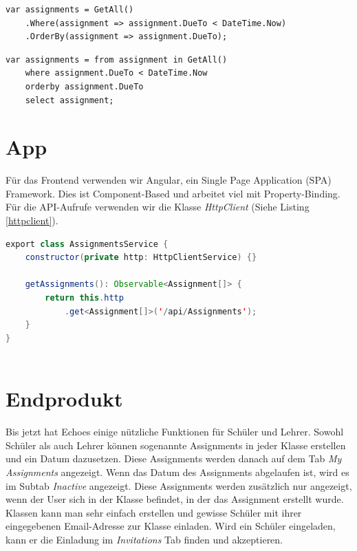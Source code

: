 \documentclass[a4paper, titlepage]{article}
\begin{document}
    \begin{lstlisting}[caption=Lambda-Syntax, label=lambda]
var assignments = GetAll()
    .Where(assignment => assignment.DueTo < DateTime.Now)
    .OrderBy(assignment => assignment.DueTo);
    \end{lstlisting}

    \begin{lstlisting}[caption=Query-Syntax, label=query]
var assignments = from assignment in GetAll()
    where assignment.DueTo < DateTime.Now
    orderby assignment.DueTo
    select assignment;
    \end{lstlisting}


    \section{App}
    Für das Frontend verwenden wir Angular, ein Single Page Application (SPA) Framework. Dies ist Component-Based
    und arbeitet viel mit Property-Binding. Für die API-Aufrufe verwenden wir die Klasse \emph{HttpClient} (Siehe 
    Listing \ref{httpclient}).

    \begin{lstlisting}[language=java,caption=HttpClient, label=httpclient]
export class AssignmentsService {
    constructor(private http: HttpClientService) {}
    
    getAssignments(): Observable<Assignment[]> {
        return this.http
            .get<Assignment[]>('/api/Assignments');
    }
}
          
    \end{lstlisting}

    \section{Endprodukt}
    Bis jetzt hat Echoes einige nützliche Funktionen für Schüler und Lehrer. Sowohl Schüler als auch Lehrer können sogenannte Assignments 
    in jeder Klasse erstellen und ein Datum dazusetzen. Diese Assignments werden danach auf dem Tab \emph{My Assignments} angezeigt. 
    Wenn das Datum des Assignments abgelaufen ist, wird es im Subtab \emph{Inactive} angezeigt. Diese Assignments werden zusätzlich nur angezeigt, 
    wenn der User sich in der Klasse befindet, in der das Assignment erstellt wurde. Klassen kann man sehr einfach erstellen und gewisse Schüler 
    mit ihrer eingegebenen Email-Adresse zur Klasse einladen. Wird ein Schüler eingeladen, kann er die Einladung im \emph{Invitations} Tab 
    finden und akzeptieren.
    
\end{document}
